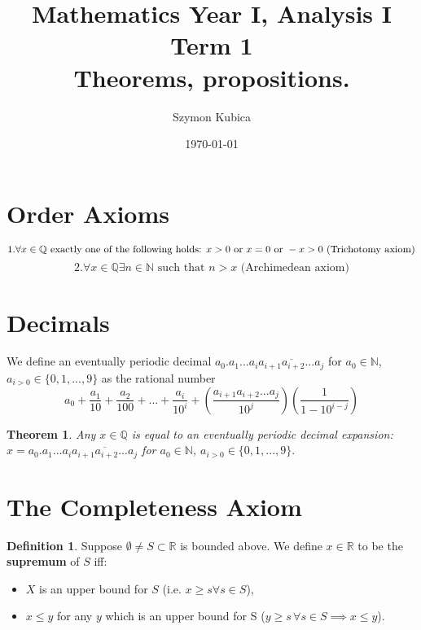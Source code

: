 \documentclass[11pt,a4paper]{article}
\newcommand\Q{\mathbb{Q}}
\newcommand\R{\mathbb{R}}
\newcommand\N{\mathbb{N}}
\newtheorem{theorem}{Theorem}
\theoremstyle{definition}
\newtheorem{definition}{Definition}
\begin{document}
\title{Mathematics Year I, Analysis I Term 1 \\ Theorems, propositions. } 
\date{\today}
\author{Szymon Kubica} 
\maketitle

\section{Order Axioms}
    \[ 1. \forall x \in \Q \text{ exactly one of the following holds: } \\ x > 0 \text{ or } x = 0 \text{ or } -x > 0 \text{ (Trichotomy axiom)} \]
    \[ 2. \forall x \in \Q \exists n \in \N \text{ such that } n > x \text{ (Archimedean axiom)}\]
\section{Decimals}
We define an eventually periodic decimal $ a_0.a_1...a_i\overline{a_{i + 1}a_{i + 2}...a_j}$ for $a_0 \in \N$, $a_{i > 0} \in \{0, 1, ..., 9\}$
as the rational number
\[ a_0 + \frac{a_1}{10} + \frac{a_2}{100} + ... + \frac{a_i}{10^{i}} + \left(\frac{a_{i + 1}a_{i + 2}...a_j}{10^{j}}\right) \left(\frac{1}{1 - 10^{i - j}}\right)\]

\begin{theorem}
    Any $ x \in \Q $ is equal to an eventually periodic decimal expansion: \\ $ x =  a_0.a_1...a_i\overline{a_{i + 1}a_{i + 2}...a_j}$ for $a_0 \in \N$, $a_{i > 0} \in \{0, 1, ..., 9\}. $
\end{theorem}

\section{The Completeness Axiom}

\begin{definition}
        Suppose $\emptyset \neq S \subset \R $ is bounded above. We define $ x \in \R $ to be the \textbf{supremum} of $S$ iff:
        \begin{itemize}
            \item $ X $ is an upper bound for $ S $ (i.e. $ x \geq s \forall s \in S $), 
            \item $ x \leq y $ for any $ y $ which is an upper bound for S ($ y \geq s \, \forall s \in S \implies x \leq y $).
        \end{itemize}

\end{definition}
\end{document}
